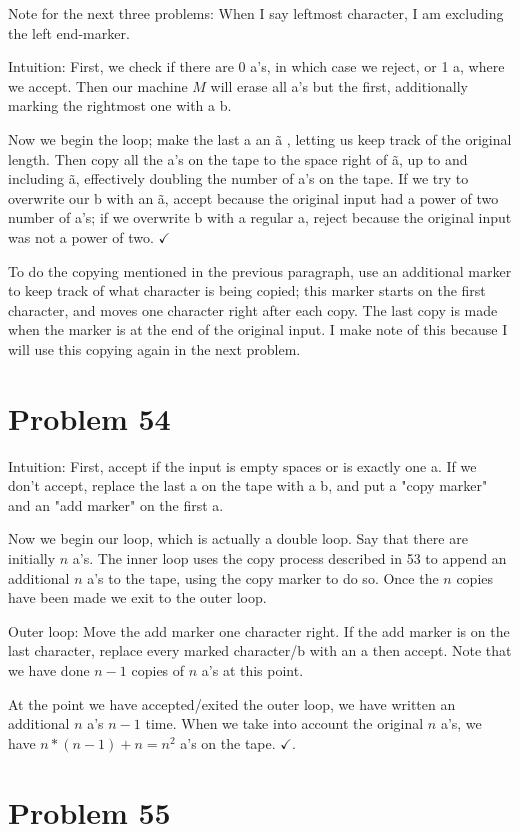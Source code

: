 \documentclass[11pt]{article}
\begin{document}
Note for the next three problems: When I say leftmost character, I am excluding the left end-marker.

Intuition: First, we check if there are 0 a's, in which case we reject, or 1 a, where we accept. Then our machine $M$ will erase all a's but the first, additionally marking the rightmost one with a b. 

Now we begin the loop; make the last a an \~a , letting us keep track of the original length. Then copy all the a's on the tape to the space right of \~a, up to and including \~a, effectively doubling the number of a's on the tape. If we try to overwrite our b with an \~a, accept because the original input had a power of two number of a's; if we overwrite b with a regular a, reject because the original input was not a power of two. $\checkmark$

To do the copying mentioned in the previous paragraph, use an additional marker to keep track of what character is being copied; this marker starts on the first character, and moves one character right after each copy. The last copy is made when the marker is at the end of the original input. I make note of this because I will use this copying again in the next problem.


\section*{Problem 54}

Intuition: First, accept if the input is empty spaces or is exactly one a. If we don't accept, replace the last a on the tape with a b, and put a "copy marker" and an "add marker" on the first a.

Now we begin our loop, which is actually a double loop. Say that there are initially $n$ a's. The inner loop uses the copy process described in 53 to append an additional $n$ a's to the tape, using the copy marker to do so. Once the $n$ copies have been made we exit to the outer loop.

Outer loop: Move the add marker one character right. If the add marker is on the last character, replace every marked character/b with an a then accept. Note that we have done $n-1$ copies of $n$ a's at this point.


At the point we have accepted/exited the outer loop, we have written an additional $n$ a's $n-1$ time. When we take into account the original $n$ a's, we have $n * (n-1) +n = n^2$ a's on the tape. $\checkmark$.


\section*{Problem 55}
\end{document}
